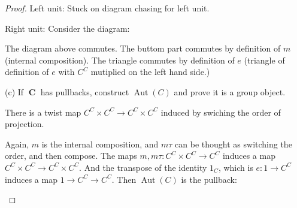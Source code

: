 \documentclass[a4paper]{article}
\DeclareMathOperator{\C}{\mathbf {C}}
\DeclareMathOperator{\Aut}{\text {Aut}}
\DeclareMathOperator{\ev}{\text {ev}}
\begin{document}
\begin{proof}
    Left unit: Stuck on diagram chasing for left unit. 

    Right unit: Consider the diagram:

    \begin{center}
    \end{center}

    The diagram above commutes. The buttom part commutes by definition of $m$ (internal composition). The triangle commutes by definition of $e$ (triangle of definition of $e$ with $C^C$ mutiplied on the left hand side.)

    (c) If $\C$ has pullbacks, construct $\Aut(C)$ and prove it is a group object. 


    There is a twist map $C^C\times C^C\to C^C\times C^C$ induced by swiching the order of projection.

    \begin{center}
    \end{center}

    Again, $m$ is the internal composition, and $m\tau$ can be thought as switching the order, and then compose. The maps $m,m\tau : C^C\times C^C\to C^C$ induces a map $C^C\times C^C\to C^C\times C^C$. And the transpose of the identity $1_C$, which is $e:1\to C^C$ induces a map $1\to C^C\to C^C$. Then $\Aut(C)$ is the pullback:
    \begin{center}
    \end{center}


\end{proof}
\end{document}
